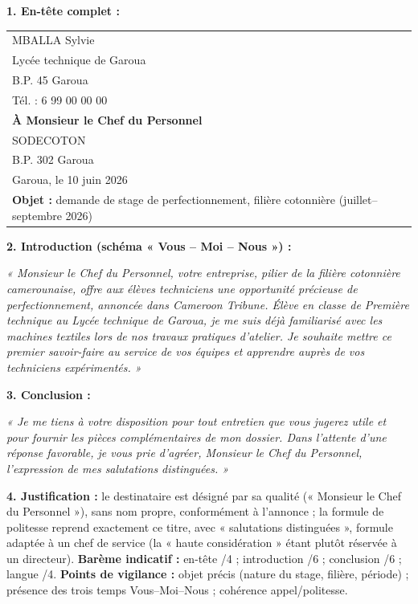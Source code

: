 \documentclass[11pt]{article}
\begin{document}
\begin{corrige}
\textbf{1. En-tête complet :}
\begin{center}
\begin{tabularx}{\linewidth}{X}
MBALLA Sylvie \\
Lycée technique de Garoua \\
B.P. 45 Garoua \\
Tél. : 6 99 00 00 00 \\[4pt]
\textbf{À Monsieur le Chef du Personnel} \\
SODECOTON \\
B.P. 302 Garoua \\
\hfill Garoua, le 10 juin 2026 \\[4pt]
\textbf{Objet :} demande de stage de perfectionnement, filière cotonnière (juillet--septembre 2026) \\
\end{tabularx}
\end{center}
\textbf{2. Introduction (schéma « Vous -- Moi -- Nous ») :}
\begin{center}
\emph{« Monsieur le Chef du Personnel, votre entreprise, pilier de la filière cotonnière camerounaise, offre aux élèves techniciens une opportunité précieuse de perfectionnement, annoncée dans \emph{Cameroon Tribune}. Élève en classe de Première technique au Lycée technique de Garoua, je me suis déjà familiarisé avec les machines textiles lors de nos travaux pratiques d'atelier. Je souhaite mettre ce premier savoir-faire au service de vos équipes et apprendre auprès de vos techniciens expérimentés. »}
\end{center}
\textbf{3. Conclusion :}
\begin{center}
\emph{« Je me tiens à votre disposition pour tout entretien que vous jugerez utile et pour fournir les pièces complémentaires de mon dossier. Dans l'attente d'une réponse favorable, je vous prie d'agréer, Monsieur le Chef du Personnel, l'expression de mes salutations distinguées. »}
\end{center}
\textbf{4. Justification :} le destinataire est désigné par sa qualité (« Monsieur le Chef du Personnel »), sans nom propre, conformément à l'annonce ; la formule de politesse reprend exactement ce titre, avec « salutations distinguées », formule adaptée à un chef de service (la « haute considération » étant plutôt réservée à un directeur).
\textbf{Barème indicatif :} en-tête /4 ; introduction /6 ; conclusion /6 ; langue /4.
\textbf{Points de vigilance :} objet précis (nature du stage, filière, période) ; présence des trois temps Vous--Moi--Nous ; cohérence appel/politesse.
\end{corrige}
\end{document}
